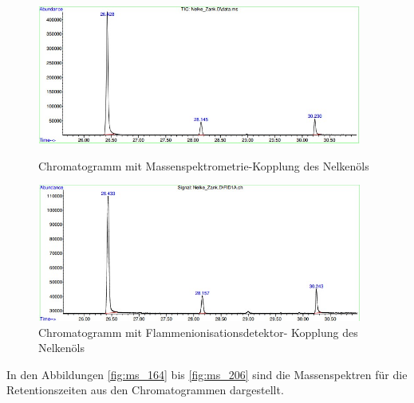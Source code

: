 \begin{figure}[h!]
	\begin{minipage}{0.45\textwidth}
		\includegraphics[width=0.95\textwidth]{img/chroma_ms}
		\caption{Chromatogramm mit Massenspektrometrie-Kopplung des Nelkenöls}\label{fig:chroma_ms}
	\end{minipage}\hfill
	\begin{minipage}{0.45\textwidth}
		\includegraphics[width=0.95\textwidth]{img/chroma_fid}
		\caption{Chromatogramm mit Flammenionisationsdetektor- Kopplung des Nelkenöls}\label{fig:chroma_fid}
	\end{minipage}\hfill
\end{figure}
\FloatBarrier

In den Abbildungen \ref{fig:ms_164} bis \ref{fig:ms_206} sind die Massenspektren für die Retentionszeiten aus den Chromatogrammen dargestellt.

